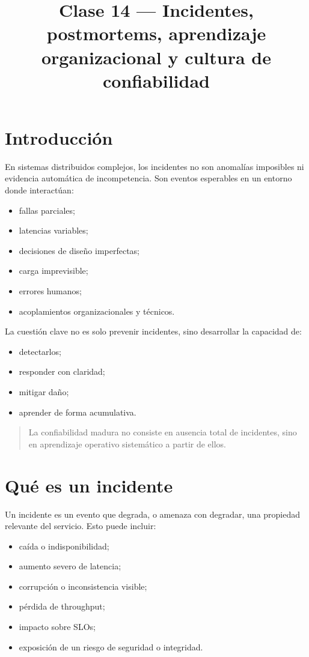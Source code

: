 \documentclass[variant=apuntes,cover=institutional,mode=screen]{ua-engineering-v6-article}
\title{Clase 14 --- Incidentes, postmortems, aprendizaje organizacional y cultura de confiabilidad}
\author{\UAProfessor}
\date{\UADate}
\begin{document}
\maketitle

\section{Introducción}

En sistemas distribuidos complejos, los incidentes no son anomalías imposibles ni evidencia automática de incompetencia. Son eventos esperables en un entorno donde interactúan:

\begin{itemize}
\item fallas parciales;
\item latencias variables;
\item decisiones de diseño imperfectas;
\item carga imprevisible;
\item errores humanos;
\item acoplamientos organizacionales y técnicos.
\end{itemize}

La cuestión clave no es solo prevenir incidentes, sino desarrollar la capacidad de:
\begin{itemize}
\item detectarlos;
\item responder con claridad;
\item mitigar daño;
\item aprender de forma acumulativa.
\end{itemize}

\begin{quote}
La confiabilidad madura no consiste en ausencia total de incidentes, sino en aprendizaje operativo sistemático a partir de ellos.
\end{quote}

\section{Qué es un incidente}

Un incidente es un evento que degrada, o amenaza con degradar, una propiedad relevante del servicio. Esto puede incluir:

\begin{itemize}
\item caída o indisponibilidad;
\item aumento severo de latencia;
\item corrupción o inconsistencia visible;
\item pérdida de throughput;
\item impacto sobre SLOs;
\item exposición de un riesgo de seguridad o integridad.
\end{itemize}
\end{document}
